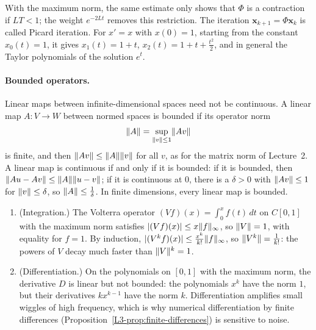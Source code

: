 With the maximum norm, the same estimate only shows that $\Phi$ is a contraction if $LT < 1$; the weight $e^{-2Lt}$ removes this restriction. The iteration $\mathbf{x}_{k+1} = \Phi\mathbf{x}_k$ is called Picard iteration. For $x' = x$ with $x(0) = 1$, starting from the constant $x_0(t) = 1$, it gives $x_1(t) = 1 + t$, $x_2(t) = 1 + t + \frac{t^2}{2}$, and in general the Taylor polynomials of the solution $e^t$.

\paragraph{Bounded operators.} Linear maps between infinite-dimensional spaces need not be continuous. A linear map $A: V \to W$ between normed spaces is bounded if its operator norm
\[\lVert A \rVert = \sup_{\lVert v \rVert \leq 1}\lVert Av \rVert\]
is finite, and then $\lVert Av \rVert \leq \lVert A \rVert\lVert v \rVert$ for all $v$, as for the matrix norm of Lecture~2. A linear map is continuous if and only if it is bounded: if it is bounded, then $\lVert Au - Av \rVert \leq \lVert A \rVert\lVert u - v \rVert$; if it is continuous at $0$, there is a $\delta > 0$ with $\lVert Av \rVert \leq 1$ for $\lVert v \rVert \leq \delta$, so $\lVert A \rVert \leq \frac{1}{\delta}$. In finite dimensions, every linear map is bounded.

\begin{example}\label{A-ex:operators}
    \begin{enumerate}
        \item (Integration.) The Volterra operator $(Vf)(x) = \int_0^x f(t)\, dt$ on $C[0, 1]$ with the maximum norm satisfies $|(Vf)(x)| \leq x\lVert f \rVert_\infty$, so $\lVert V \rVert = 1$, with equality for $f = 1$. By induction, $|(V^kf)(x)| \leq \frac{x^k}{k!}\lVert f \rVert_\infty$, so $\lVert V^k \rVert = \frac{1}{k!}$: the powers of $V$ decay much faster than $\lVert V \rVert^k = 1$.
        \item (Differentiation.) On the polynomials on $[0, 1]$ with the maximum norm, the derivative $D$ is linear but not bounded: the polynomials $x^k$ have the norm $1$, but their derivatives $kx^{k-1}$ have the norm $k$. Differentiation amplifies small wiggles of high frequency, which is why numerical differentiation by finite differences (Proposition~\ref{L3-prop:finite-differences}) is sensitive to noise.
    \end{enumerate}
\end{example}

